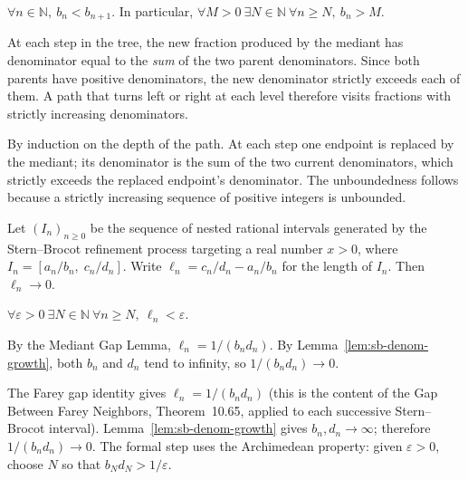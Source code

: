 \begin{remark}
$\forall n \in \mathbb{N},\ b_n < b_{n+1}$.
In particular, $\forall M > 0\ \exists N \in \mathbb{N}\ \forall n \ge N,\ b_n > M$.
\end{remark}

\begin{remark}[Intuition]
At each step in the tree, the new fraction produced by the mediant has
denominator equal to the \emph{sum} of the two parent denominators.
Since both parents have positive denominators, the new denominator
strictly exceeds each of them. A path that turns left or right at each
level therefore visits fractions with strictly increasing denominators.
\end{remark}

\begin{remark}
By induction on the depth of the path. At each step one endpoint
is replaced by the mediant; its denominator is the sum of the two
current denominators, which strictly exceeds the replaced endpoint's
denominator. The unboundedness follows because a strictly increasing
sequence of positive integers is unbounded.
\end{remark}


\begin{lemma}
\label{lem:sb-length-zero}
Let $(I_n)_{n \ge 0}$ be the sequence of nested rational intervals generated
by the Stern--Brocot refinement process targeting a real number $x > 0$,
where $I_n = [a_n/b_n,\; c_n/d_n]$.  Write $\ell_n = c_n/d_n - a_n/b_n$
for the length of $I_n$.  Then $\ell_n \to 0$.
\end{lemma}

\begin{remark}
$\forall \varepsilon > 0\ \exists N \in \mathbb{N}\ \forall n \ge N,\ \ell_n < \varepsilon$.
\end{remark}

\begin{remark}[Intuition]
By the Mediant Gap Lemma, $\ell_n = 1/(b_n d_n)$.
By Lemma~\ref{lem:sb-denom-growth}, both $b_n$ and $d_n$ tend to infinity,
so $1/(b_n d_n) \to 0$.
\end{remark}

\begin{remark}
The Farey gap identity gives $\ell_n = 1/(b_n d_n)$ (this is the content
of the Gap Between Farey Neighbors, Theorem~10.65, applied to each
successive Stern--Brocot interval). Lemma~\ref{lem:sb-denom-growth} gives
$b_n, d_n \to \infty$; therefore $1/(b_n d_n) \to 0$.
The formal step uses the Archimedean property: given $\varepsilon > 0$,
choose $N$ so that $b_N d_N > 1/\varepsilon$.
\end{remark}

